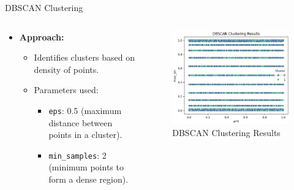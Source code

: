\documentclass{beamer}
\begin{document}
\begin{frame}{DBSCAN Clustering}
    \begin{columns} %
    \begin{column}{0.6\textwidth}
    \begin{itemize}
        \item \textbf{Approach:}
        \begin{itemize}
            \item Identifies clusters based on density of points.
            \item Parameters used:
            \begin{itemize}
                \item \texttt{eps}: 0.5 (maximum distance between points in a cluster).
                \item \texttt{min\_samples}: 2 (minimum points to form a dense region).
            \end{itemize}
        \end{itemize}
    \end{itemize}
    \end{column}

    \begin{column}{0.4\textwidth}
    \begin{figure}
        \centering
        \includegraphics[width=1\textwidth]{images/dbscan.png} %
        \caption{DBSCAN Clustering Results}
    \end{figure}
\end{column}
\end{columns}
\end{frame}
\end{document}
